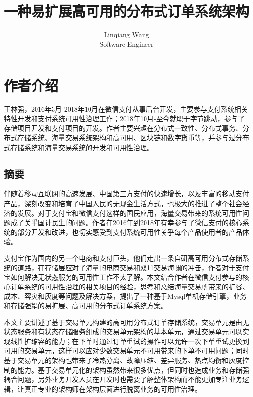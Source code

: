 \documentclass[letterpaper,twocolumn,10pt]{article}
\begin{document}
\date{}

\title{\Large \bf 一种易扩展高可用的分布式订单系统架构}

\author{
{\rm Linqiang Wang}\\
Software Engineer
}

\maketitle

\thispagestyle{empty}

\section*{作者介绍}
王林强，2016年3月-2018年10月在微信支付从事后台开发，主要参与支付系统相关特性开发和支付系统可用性治理工作；2018年10月-至今就职于字节跳动，参与了存储项目开发和支付项目的开发。作者主要兴趣在分布式一致性、分布式事务、分布式存储系统、海量交易系统架构和高可用、区块链和数字货币等，并参与过分布式存储系统和海量交易系统的开发和可用性治理。

\subsection*{摘要}
伴随着移动互联网的高速发展、中国第三方支付的快速增长，以及丰富的移动支付产品，深刻改变和培育了中国人民的无现金生活方式，也极大的推进了整个社会经济的发展。对于支付宝和微信支付这样的国民应用，海量交易带来的系统可用性问题成了关乎国计民生的问题。作者在2016年到2018年有幸参与了微信支付的核心系统的部分开发和改进，也切实感受到支付系统可用性关乎每个产品使用者的产品体验。

支付宝作为国内的另一个电商和支付巨头，他们走出一条自研高可用分布式存储系统的道路，在存储层应对了海量的电商交易和双11交易海啸的冲击，作者对于支付宝如何解决无状态服务的可用性工作不太了解。本文结合作者在微信支付参与的核心订单系统的可用性治理的相关项目的经验，思考和总结海量交易所带来的扩容、成本、容灾和灰度等问题及解决方案，提出了一种基于Mysql单机存储引擎，业务和存储强耦的易扩展、高可用的分布式订单系统方案。

本文主要讲述了基于交易单元构建的高可用分布式订单存储系统，交易单元是由无状态服务和有状态存储服务组成的交易单元架构的基本单元，通过交易单元可以实现线性扩缩容的能力；在下单时通过订单重试的操作可以允许一次下单重试更换到可用的交易单元，这样可以应对少数交易单元不可用带来的下单不可用问题；同时基于交易单元的架构也带来了冷热分离、故障压缩、差异服务、热点均衡和灰度控制的能力。基于交易单元化的架构虽然带来很多优点，但同时也造成业务和存储强耦合问题，另外业务开发人员在开发时也需要了解整体架构而不能更加专注业务逻辑，让真正专业的架构师在架构层面进行脱离业务的可用性治理。
\end{document}
